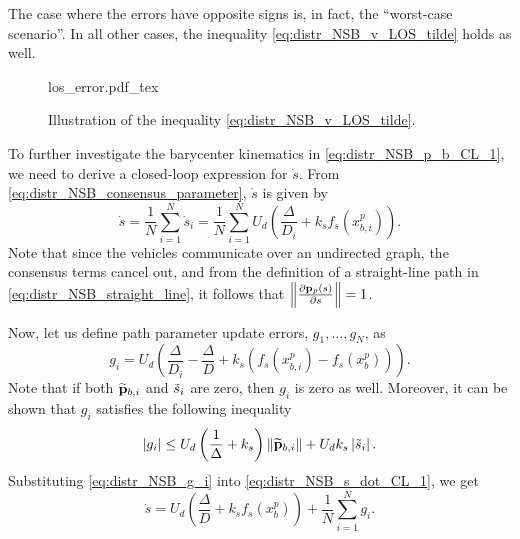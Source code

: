 The case where the errors have opposite signs is, in fact, the ``worst-case scenario''.
In all other cases, the inequality \eqref{eq:distr_NSB_v_LOS_tilde} holds as well.

\begin{figure}[tb]
    \centering
    \def\svgwidth{0.45\textwidth}
    {los_error.pdf_tex}
    \caption{Illustration of the inequality \eqref{eq:distr_NSB_v_LOS_tilde}.}
    \label{fig:distr_NSB_los_error}
\end{figure}

To further investigate the barycenter kinematics in \eqref{eq:distr_NSB_p_b_CL_1}, we need to derive a closed-loop expression for $\dot{s}$.
From \eqref{eq:distr_NSB_consensus_parameter}, $\dot{s}$ is given by
\begin{equation}
    \dot{s} = \frac{1}{N} \sum_{i=1}^N \dot{s}_i = \frac{1}{N} \sum_{i=1}^N U_{d\!} \left(\!\frac{\Delta}{D_i} + k_s f_{s}\!\left(\!x_{b, i\!}^p\right)\!\right).
    \label{eq:distr_NSB_s_dot_CL_1}
\end{equation}
Note that since the vehicles communicate over an undirected graph, the consensus terms cancel out, and from the definition of a straight-line path in \eqref{eq:distr_NSB_straight_line}, it follows that $\left\|\frac{\partial \mathbf{p}_p(s)}{\partial s}\right\| = 1$.

Now, let us define path parameter update errors, $g_1, \ldots, g_N$, as
\begin{equation}
    g_i = U_{d\!} \left(\!\frac{\Delta}{D_i} - \frac{\Delta}{D} + k_s \! \left(f_{s\!\!}\left(x_{b, i\!}^p\right) - f_{s\!}\left(x_{b\!}^p\right)\right)\!\right).
    \label{eq:distr_NSB_g_i}
\end{equation}
Note that if both $\widetilde{\mathbf{p}}_{b, i}$ and $\Tilde{s}_i$ are zero, then $g_i$ is zero as well.
Moreover, it can be shown that $g_i$ satisfies the following inequality
\begin{equation}
    \left|g_i\right| \leq U_d \left(\frac{1}{\Delta} + k_s\right) \left\|\widetilde{\mathbf{p}}_{b, i}\right\| + U_d k_s \left|\Tilde{s}_i\right|.
    \label{eq:distr_NSB_g_i_bound}
\end{equation}
Substituting \eqref{eq:distr_NSB_g_i} into \eqref{eq:distr_NSB_s_dot_CL_1}, we get
\begin{equation}
    \dot{s} = U_{d\!} \left(\!\frac{\Delta}{D} + k_s f_{s\!}\left(x_{b\!}^p\right)\right) + \frac{1}{N} \sum_{i=1}^N g_i.
    \label{eq:distr_NSB_s_dot_CL}
\end{equation}

